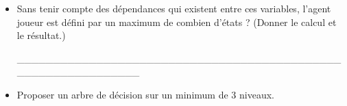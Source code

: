 \documentclass[a4paper, 10pt]{article}
\begin{document}
\begin{itemize}[$\bigcirc$]
\_\_\_\_\_\_\_\_\_\_\_\_\_\_\_\_\_\_\_\_\_\_\_\_\_\_\_\_\_\_\_\_\_\_\_\_\_\_\_\_\_\_\_\_\_\_\_\_\_\_\_\_\_\_\_\_\_\_\_\_\_\_

\medskip

\_\_\_\_\_\_\_\_\_\_\_\_\_\_\_\_\_\_\_\_\_\_\_\_\_\_\_\_\_\_\_\_\_\_\_\_\_\_\_\_\_\_\_\_\_\_\_\_\_\_\_\_\_\_\_\_\_\_\_\_\_\_

\medskip

\_\_\_\_\_\_\_\_\_\_\_\_\_\_\_\_\_\_\_\_\_\_\_\_\_\_\_\_\_\_\_\_\_\_\_\_\_\_\_\_\_\_\_\_\_\_\_\_\_\_\_\_\_\_\_\_\_\_\_\_\_\_

\medskip

\_\_\_\_\_\_\_\_\_\_\_\_\_\_\_\_\_\_\_\_\_\_\_\_\_\_\_\_\_\_\_\_\_\_\_\_\_\_\_\_\_\_\_\_\_\_\_\_\_\_\_\_\_\_\_\_\_\_\_\_\_\_

\medskip

\_\_\_\_\_\_\_\_\_\_\_\_\_\_\_\_\_\_\_\_\_\_\_\_\_\_\_\_\_\_\_\_\_\_\_\_\_\_\_\_\_\_\_\_\_\_\_\_\_\_\_\_\_\_\_\_\_\_\_\_\_\_

\medskip

\_\_\_\_\_\_\_\_\_\_\_\_\_\_\_\_\_\_\_\_\_\_\_\_\_\_\_\_\_\_\_\_\_\_\_\_\_\_\_\_\_\_\_\_\_\_\_\_\_\_\_\_\_\_\_\_\_\_\_\_\_\_

\medskip

\item Sans tenir compte des dépendances qui existent entre ces variables, l'agent joueur est défini par un maximum de combien d'états ? (Donner le calcul et le résultat.)

\medskip

\_\_\_\_\_\_\_\_\_\_\_\_\_\_\_\_\_\_\_\_\_\_\_\_\_\_\_\_\_\_\_\_\_\_\_\_\_\_\_\_\_\_\_\_\_\_\_\_\_\_\_\_\_\_\_\_\_\_\_\_\_\_

\medskip

\item Proposer un arbre de décision sur un minimum de $3$ niveaux.


\newpage

\begin{lstlisting}[caption={Votre Arbre de Decision}]













































\end{lstlisting}
\end{itemize}
\end{document}
